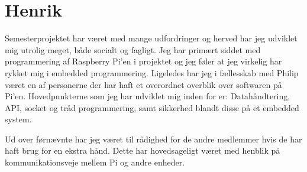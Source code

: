 \section{Henrik}
Semesterprojektet har været med mange udfordringer og herved har jeg udviklet mig utrolig meget, både socialt og fagligt.
Jeg har primært siddet med programmering af Raspberry Pi'en i projektet og jeg føler at jeg virkelig har rykket mig i embedded programmering.
Ligeledes har jeg i fællesskab med Philip været en af personerne der har haft et overordnet overblik over softwaren på Pi'en.
Hovedpunkterne som jeg har udviklet mig inden for er: Datahåndtering, API, socket og tråd programmering, samt sikkerhed blandt disse på et embedded system.

Ud over førnævnte har jeg været til rådighed for de andre medlemmer hvis de har haft brug for en ekstra hånd. Dette har hovedsageligt været med henblik på kommunikationsveje mellem Pi og andre enheder.